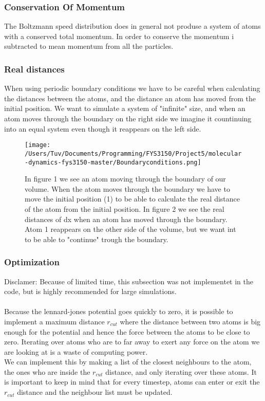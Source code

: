 \documentclass[a4paper, 12pt]{article}
\begin{document}
\subsubsection{Conservation Of Momentum}
The Boltzmann speed distribution does in general not produse a system of atoms with a conserved total momentum. In order to conserve the momentum i subtracted to mean momentum from all the particles.

\subsubsection{Real distances}
When using periodic boundary conditions we have to be careful when calculating the distances between the atoms, and the distance an atom has moved from the initial position. We want to simulate a system of "infinite" size, and when an atom moves through the boundary on the right side we imagine it countinuing into an equal system even though it reappears on the left side.
\begin{figure}[H]
\centering
\texttt{[image: /Users/Tuv/Documents/Programming/FYS3150/Project5/molecular-dynamics-fys3150-master/Boundaryconditions.png]}
\caption{In figure 1 we see an atom moving through the boundary of our volume. When the atom moves through the boundary we have to move the initial position (1) to be able to calculate the real distance of the atom from the initial position.
In figure 2 we see the real distances of dx when an atom has moved through the boundary. Atom 1 reappears on the other side of the volume, but we want int to be able to "continue" trough the boundary. }
\end{figure}
\subsubsection{Optimization}
Disclamer: Because of limited time, this subsection was not implementet in the code, but is highly recommended for large simulations.\\
\\
Because the lennard-jones potential goes quickly to zero, it is possible to implement a maximum distance $r_{cut}$ where the distance between two atoms is big enough for the potential and hence the force between the atoms to be close to zero. Iterating over atoms who are to far away to exert any force on the atom we are looking at is a waste of computing power.\\
We can implement this by making a list of the closest neighbours to the atom, the ones who are inside the $r_{cut}$ distance, and only iterating over these atoms. It is important to keep in mind that for every timestep, atoms can enter or exit the $r_{cut}$ distance and the neighbour list must be updated.
\newpage
\end{document}
